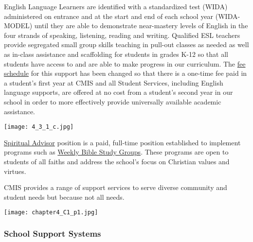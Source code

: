 \begin{findings}
English Language Learners are identified with a standardized test (WIDA) administered on entrance and at the start and end of each school year (WIDA-MODEL) until they are able to demonstrate near-mastery levels of English in the four strands of speaking, listening, reading and writing.  Qualified ESL teachers provide segregated small group skills teaching in pull-out classes as needed as well as in-class assistance and scaffolding for students in grades K-12 so that all students have access to and are able to make progress in our curriculum. The \href{https://docs.google.com/document/d/1j2Z1tLgRgfX9CH3dzoYtU_GOhPOVWKPl6iFlvWqd6wM/edit}{fee schedule} for this support has been changed so that there is a one-time fee paid in a student’s first year at CMIS and all Student Services, including English language supports, are offered at no cost from a student’s second year in our school in order to more effectively provide universally available academic assistance. 

{\centering\texttt{[image: 4\_3\_1\_c.jpg]}}

\href{http://blogs.cmis.ac.th/eagles/faith-service/spiritual-life/}{Spiritual Advisor} position is a paid, full-time position established to implement programs such as \href{http://blogs.cmis.ac.th/eagles/faith-service/spiritual-life/}{Weekly Bible Study Groups}. These programs are open to students of all faiths and address the school’s focus on Christian values and virtues.


CMIS provides a range of support services to serve diverse community and student needs but because not all needs.
\end{findings}

{\centering\texttt{[image: chapter4\_C1\_p1.jpg]}}

\subsubsection{School Support Systems}



